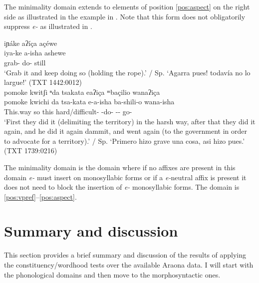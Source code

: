 \documentclass[output=paper,hidelinks]{langscibook}
\begin{document}
The minimality domain extends to elements of position \ref{pos:aspect} on the right side as illustrated in the example in . Note that this form does not obligatorily suppress \textit{e-} as illustrated in .

\ea 
 \ea\label{ex:aisha}
    iɲáke aʔíça açéwe \downarrow \\
    \gll  iya-ke a-isha ashewe  \\
    grab-\Imp{} do-\Freq{} still \\
    \glt `Grab it and keep doing so (holding the rope).' / Sp. `Agarra pues! todavía no lo largue!' \hfill (TXT 1442:0012)\\
 \ex\label{ex:eaisha}
    pomoke kwitʃi ⁿda tsakata eaʔiça ᵐbaçilio wanaʔiça \downarrow \\
    \gll pomoke	kwichi da tsa-kata e-a-isha ba-shili-o wana-isha   \\
     This.way so this hard/difficult-\Aug{} \E{}-do-\Freq{} \Vis{}-\Deprec{}-\Limit{} go-\Freq{} \\
    \glt `First they did it (delimiting the territory) in the harsh way, after that they did it again, and he did it again dammit, and went again (to the government in order to advocate for a territory).' / Sp. `Primero hizo grave una cosa, asi hizo pues.' \hfill (TXT 1739:0216)\\
 \z
\z 

The minimality domain is the domain where if no affixes are present in this domain \textit{e-} must insert on monosyllabic forms or if a \textit{e-}neutral affix is present it does not need to block the insertion of \textit{e-} monosyllabic forms. The domain is \ref{pos:vpref}--\ref{pos:aspect}.


\section{Summary and discussion} %
\label{araona:sec:summary}

This section provides a brief summary and discussion of the results of applying the constituency/wordhood tests over the available Araona data. I will start with the phonological domains and then move to the morphosyntactic ones.
\end{document}
